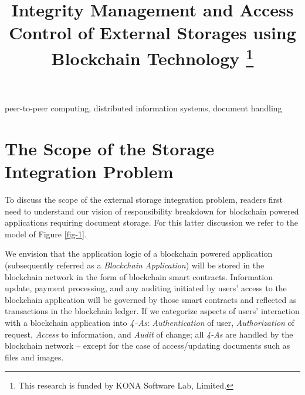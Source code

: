 \documentclass[conference]{IEEEtran}
\begin{document}
\title{Integrity Management and Access Control of External Storages using Blockchain Technology 
	\thanks{This research is funded by KONA Software Lab, Limited.}
}

\author{
	\and
}
\maketitle

\begin{abstract}
\end{abstract}

\begin{IEEEkeywords}
peer-to-peer computing, distributed information systems, document handling  
\end{IEEEkeywords}



\section{The Scope of the Storage Integration Problem}
\label{s-scope}
To discuss the scope of the external storage integration problem, readers first need to understand our vision of responsibility breakdown for blockchain powered applications requiring document storage. For this latter discussion we refer to the model of Figure \ref{fig-1}.

We envision that the application logic of a blockchain powered application (subsequently referred as a \textit{Blockchain Application}) will be stored in the blockchain network in the form of blockchain smart contracts. Information update, payment processing, and any auditing initiated by users' access to the blockchain application will be governed by those smart contracts and reflected as transactions in the blockchain ledger. If we categorize aspects of users' interaction with a blockchain application into \textit{4--As}: \textit{Authentication} of user, \textit{Authorization} of request, \textit{Access} to information, and \textit{Audit} of change; all \textit{4-As} are handled by the blockchain network -- except for the case of access/updating documents such as files and images.
\end{document}

